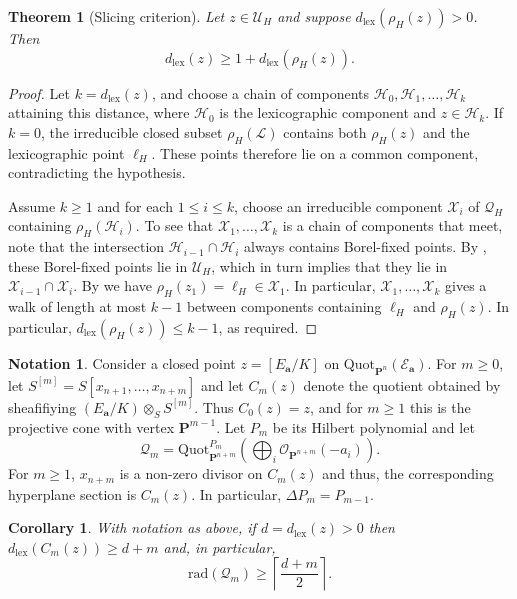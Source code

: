 \documentclass[leqno,11pt,a4paper]{amsart}
\newtheorem{thm}{Theorem}[section]
\newtheorem{cor}[cor]{Corollary}
\theoremstyle{definition}
\newtheorem{notation}[notation]{Notation}
\numberwithin{equation}{section}
\newcommand{\bfa}{\mathbf{a}}
\newcommand{\lex}{\mathrm{lex}}
\newcommand{\rad}{\mathrm{rad}}
\newcommand{\Quot}{\mathrm{Quot}}
\newcommand{\PP}{\mathbf{P}}
\newcommand{\EE}{\mathscr{E}}
\newcommand{\OO}{\mathscr{O}}
\newcommand{\HH}{\mathcal{H}}
\newcommand{\LL}{\mathcal{L}}
\newcommand{\QQ}{\mathcal{Q}}
\newcommand{\UU}{\mathcal{U}}
\newcommand{\XX}{\mathcal{X}}
\begin{document}
\begin{thm}[Slicing criterion]\label{slicing_criterion}
Let $z\in\UU_H$ and suppose $d_{\lex}(\rho_H(z))>0$. 
Then
$$
d_{\lex}(z) \geq 1+d_{\lex}(\rho_H(z)).
$$
\end{thm}

\begin{proof}
Let $k=d_{\lex}(z)$, and choose a chain of components $\HH_0,\HH_1,\ldots,\HH_k$ attaining this distance, where $\HH_0$ is the lexicographic component and $z \in \HH_k$.
If $k=0$, the irreducible closed subset $\rho_H(\LL)$ contains both $\rho_H(z)$ and the lexicographic point $\ell_H$. These points therefore lie on a common component, contradicting the hypothesis.

Assume $k \geq 1$ and for each $1\leq i\leq k$, choose an irreducible component $\mathcal{X}_i$ of $\QQ_H$ containing $\rho_H(\HH_i)$. 
To see that $\XX_1,\dots,\XX_k$ is a chain of components that meet, note that the intersection $\HH_{i-1} \cap \HH_i$ always contains Borel-fixed points. 
By , these Borel-fixed points lie in $\UU_H$, which in turn implies that they lie in $\XX_{i-1} \cap \XX_i$. 
By  we have $\rho_H(z_1)=\ell_H \in \XX_1$. 
In particular, $\XX_1,\ldots,\XX_k$ gives a walk of length at most $k-1$ between components containing $\ell_H$ and $\rho_H(z)$. 
In particular, $d_{\lex}(\rho_H(z))\leq k-1$, as required.
\end{proof}

\begin{notation}
Consider a closed point $z = [E_{\bfa}/K]$ on $\Quot_{\PP^n}(\EE_\bfa)$. 
For $m \geq 0$, let $S^{[m]}= S[x_{n+1},\dots,x_{n+m}]$ and let $C_m(z)$ denote the quotient obtained by sheafifiying $(E_\bfa/K) \otimes_S S^{[m]}$. 
Thus $C_0(z) =z$, and for $m\geq 1$ this is the projective cone with vertex $\PP^{m-1}$. 
Let $P_m$ be its Hilbert polynomial and let
$$
\QQ_m=\Quot_{\PP^{n+m}}^{P_m}
\left(\bigoplus_i\OO_{\PP^{n+m}}(-a_i)\right).
$$
For $m\geq 1$, $x_{n+m}$ is a non-zero divisor on $C_m(z)$ and thus, the corresponding hyperplane section is $C_m(z)$. 
In particular, $\Delta P_m=P_{m-1}$.
\end{notation}

\begin{cor}\label{cone_distance}
With notation as above, if $d=d_{\lex}(z)>0$ then $d_{\lex}(C_m(z))\geq d+m$  and, in particular,
$$
\rad(\QQ_m)\geq
\left\lceil\frac{d+m}{2}\right\rceil.
$$
\end{cor}
\end{document}

